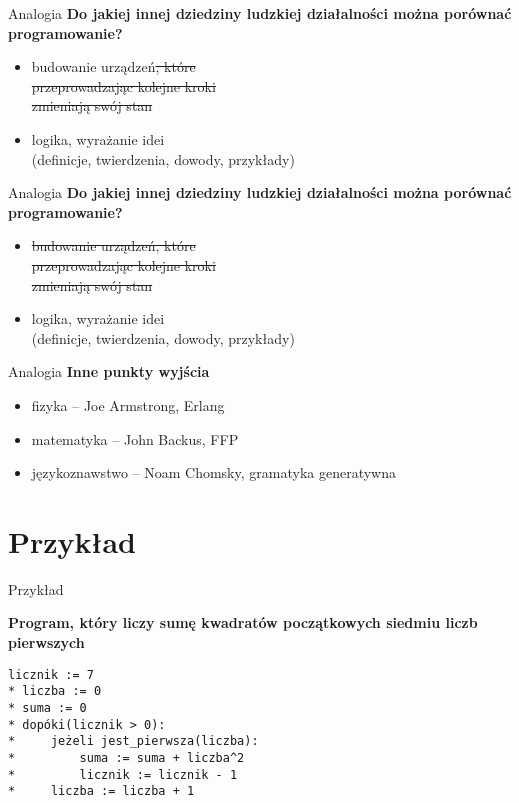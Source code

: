 \documentclass{beamer}
\begin{document}
\begin{frame}{Analogia}
  \textbf{Do jakiej innej dziedziny ludzkiej działalności
    można porównać programowanie?}
  \begin{itemize}
  \item budowanie urządzeń\sout{, które \\
    przeprowadzając kolejne kroki} \\
    \sout{zmieniają swój stan}
  \item logika, wyrażanie idei \\
    (definicje, twierdzenia, dowody, przykłady)
  \end{itemize}
\end{frame}


\begin{frame}{Analogia}
  \textbf{Do jakiej innej dziedziny ludzkiej działalności
    można porównać programowanie?}
  \begin{itemize}
  \item \sout{budowanie urządzeń}\sout{, które \\
      przeprowadzając kolejne kroki} \\
    \sout{zmieniają swój stan}
  \item logika, wyrażanie idei \\
    (definicje, twierdzenia, dowody, przykłady)
  \end{itemize}
\end{frame}


\begin{frame}{Analogia}
  \textbf{Inne punkty wyjścia}
  \pause
  \begin{itemize}
  \item fizyka -- Joe Armstrong, Erlang
    \pause
  \item matematyka -- John Backus, FFP
    \pause
  \item językoznawstwo -- Noam Chomsky, gramatyka generatywna
  \end{itemize}
\end{frame}

\section{Przykład}

\begin{frame}{Przykład}

  \textbf{Program, który liczy sumę kwadratów
    początkowych siedmiu liczb pierwszych}

  \pause
  \texttt{licznik := 7\\*
liczba := 0\\*
suma := 0\\*
dopóki(licznik > 0):\\*
\ \ \ \ jeżeli jest\_pierwsza(liczba):\\*
\ \ \ \ \ \ \ \ suma := suma + liczba\^{}2\\*
\ \ \ \ \ \ \ \ licznik := licznik - 1\\*
\ \ \ \ liczba := liczba + 1
  }
   
\end{frame}
\end{document}
